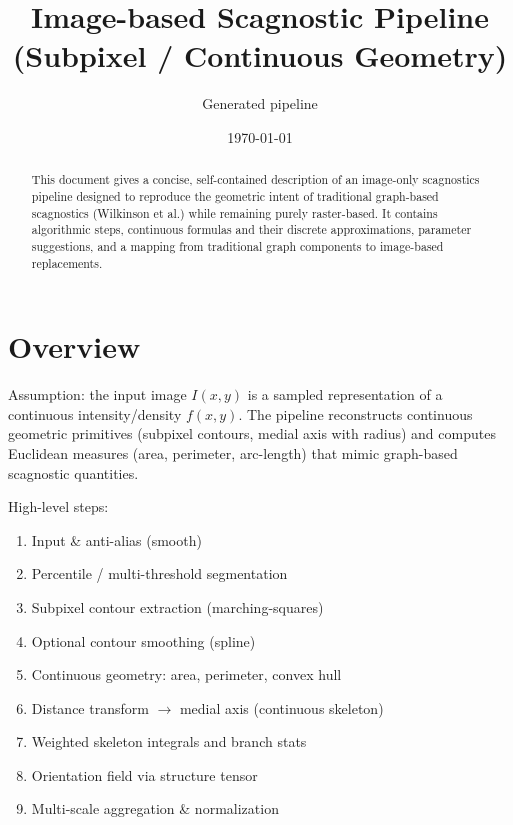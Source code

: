 \documentclass[11pt]{article}
\title{Image-based Scagnostic Pipeline (Subpixel / Continuous Geometry)}
\author{Generated pipeline}
\date{\today}
\begin{document}
\maketitle

\begin{abstract}
This document gives a concise, self-contained description of an image-only scagnostics pipeline designed to reproduce the geometric intent of traditional graph-based scagnostics (Wilkinson et al.) while remaining purely raster-based. It contains algorithmic steps, continuous formulas and their discrete approximations, parameter suggestions, and a mapping from traditional graph components to image-based replacements.
\end{abstract}

\section{Overview}
Assumption: the input image \(I(x,y)\) is a sampled representation of a continuous intensity/density \(f(x,y)\). The pipeline reconstructs continuous geometric primitives (subpixel contours, medial axis with radius) and computes Euclidean measures (area, perimeter, arc-length) that mimic graph-based scagnostic quantities.

High-level steps:
\begin{enumerate}[leftmargin=*,noitemsep]
  \item Input \& anti-alias (smooth)
  \item Percentile / multi-threshold segmentation
  \item Subpixel contour extraction (marching-squares)
  \item Optional contour smoothing (spline)
  \item Continuous geometry: area, perimeter, convex hull
  \item Distance transform \(\rightarrow\) medial axis (continuous skeleton)
  \item Weighted skeleton integrals and branch stats
  \item Orientation field via structure tensor
  \item Multi-scale aggregation \& normalization
\end{enumerate}
\end{document}
